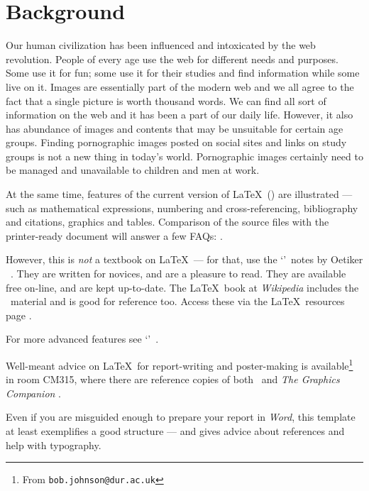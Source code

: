 \section{Background}\label{intro}
Our human civilization has been influenced and intoxicated by the web revolution. People of every age use the web for different needs and purposes. Some use it for fun; some use it for their studies and find information while some live on it. Images are essentially part of the modern web and we all agree to the fact that a single picture is worth thousand words. We can find all sort of information on the web and it has been a part of our daily life. However, it also has abundance of images and contents that may be unsuitable for certain age groups. Finding pornographic images posted on social sites and links on study groups is not a new thing in today’s world. Pornographic images certainly need to be managed and unavailable to children and men at work.  
\par
At the same time, features of the current version of \LaTeX\ (\LaTeXe)
are illustrated --- such as mathematical expressions, numbering and
cross-referencing, bibliography and citations, graphics and tables.
Comparison of the source files with the printer-ready document will
answer a few FAQs: .
\par
However, this is {\em not} a textbook on \LaTeX\ --- for that, use the
\lq\nss\rq\ notes by Oetiker \etal\ . They are written for
novices, and are a pleasure to read. They are available free on-line,
and are kept up-to-date. The \LaTeX\ book at \textsl{Wikipedia}
 includes the \nss\ material and is good for reference too.
Access these via the \LaTeX\ resources page .
\par
For more advanced features see \eg\lq\comp\rq\ .
\par
Well-meant advice on \LaTeX\ for report-writing and poster-making is
available\footnote{From  \texttt{bob.johnson@dur.ac.uk}} in room CM315,
where there are reference copies of both \comp\  and
\textsl{The Graphics Companion} .
\par
Even if you are misguided enough  to prepare your report in
\textsl{Word}, this template at least exemplifies a good structure ---
and gives advice about references and help with typography.
%
